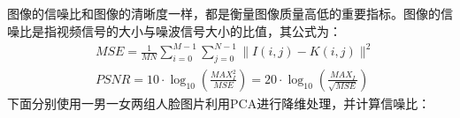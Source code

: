 \documentclass[lang=cn,a4paper,cite=authoryear]{elegantpaper}
\begin{document}
\subsection*{}
图像的信噪比和图像的清晰度一样，都是衡量图像质量高低的重要指标。图像的信噪比是指视频信号的大小与噪波信号大小的比值，其公式为：
\begin{equation}
	\begin{aligned}
		&M S E=\frac{1}{M N} \sum_{i=0}^{M-1} \sum_{j=0}^{N-1}\|I(i, j)-K(i, j)\|^{2} \\
		&P S N R=10 \cdot \log _{10}\left(\frac{M A X_{I}^{2}}{M S E}\right)=20 \cdot \log _{10}\left(\frac{M A X_{I}}{\sqrt{M S E}}\right)
	\end{aligned}
\end{equation}
下面分别使用一男一女两组人脸图片利用PCA进行降维处理，并计算信噪比：
\end{document}
